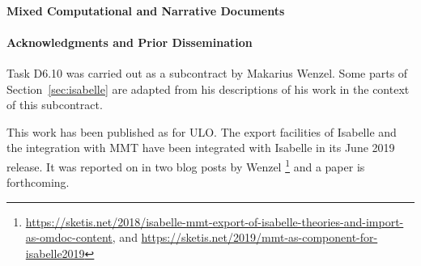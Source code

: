 \paragraph{Mixed Computational and Narrative Documents}

\paragraph{Acknowledgments and Prior Dissemination}
Task D6.10  was carried out as a subcontract by Makarius Wenzel.
Some parts of Section~\ref{sec:isabelle} are adapted from his descriptions of his work in the context of this subcontract.

This work has been published as  for ULO.
The export facilities of Isabelle and the integration with MMT have been integrated with Isabelle in its June 2019 release.
It was reported on in two blog posts by Wenzel%
\footnote{\url{https://sketis.net/2018/isabelle-mmt-export-of-isabelle-theories-and-import-as-omdoc-content}, and \url{https://sketis.net/2019/mmt-as-component-for-isabelle2019}}
and a paper is forthcoming.

